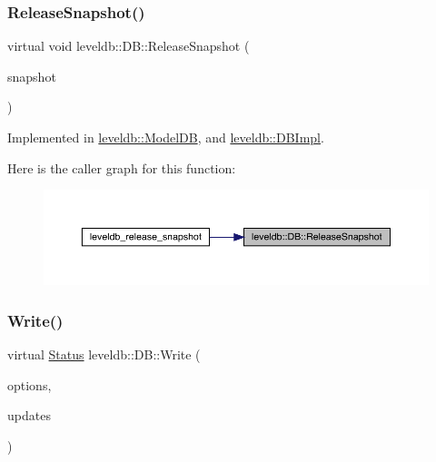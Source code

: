 \subsubsection{\texorpdfstring{ReleaseSnapshot()}{ReleaseSnapshot()}}
{\footnotesize\ttfamily virtual void leveldb\+::\+D\+B\+::\+Release\+Snapshot (\begin{DoxyParamCaption}\item[{const \mbox{\hyperlink{classleveldb_1_1_snapshot}{Snapshot}} $\ast$}]{snapshot }\end{DoxyParamCaption})\hspace{0.3cm}{\ttfamily [pure virtual]}}



Implemented in \mbox{\hyperlink{classleveldb_1_1_model_d_b_a3f5d86ce612baaa88c11601c9a59df12}{leveldb\+::\+Model\+DB}}, and \mbox{\hyperlink{classleveldb_1_1_d_b_impl_a6c0b6abfc9a30cc8e5412d4fc3e8c886}{leveldb\+::\+D\+B\+Impl}}.

Here is the caller graph for this function\+:
\nopagebreak
\begin{figure}[H]
\begin{center}
\leavevmode
\includegraphics[width=350pt]{classleveldb_1_1_d_b_aa46de65e990bd179db0aee770af89144_icgraph}
\end{center}
\end{figure}
\mbox{\label{classleveldb_1_1_d_b_ae0b6ded8c8e0b88ff70190bf7a0c086c}} 
\subsubsection{\texorpdfstring{Write()}{Write()}}
{\footnotesize\ttfamily virtual \mbox{\hyperlink{classleveldb_1_1_status}{Status}} leveldb\+::\+D\+B\+::\+Write (\begin{DoxyParamCaption}\item[{const \mbox{\hyperlink{structleveldb_1_1_write_options}{Write\+Options}} \&}]{options,  }\item[{\mbox{\hyperlink{classleveldb_1_1_write_batch}{Write\+Batch}} $\ast$}]{updates }\end{DoxyParamCaption})\hspace{0.3cm}{\ttfamily [pure virtual]}}



